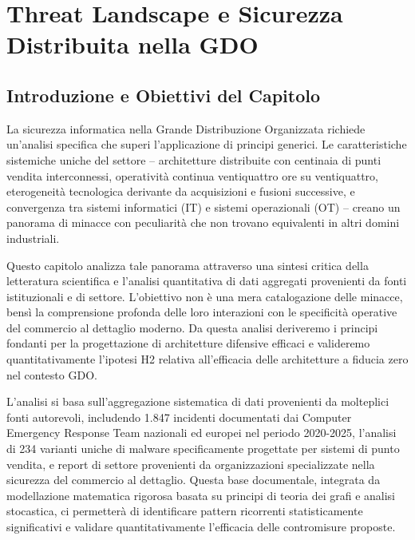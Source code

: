 \chapter{Threat Landscape e Sicurezza Distribuita nella GDO}
\label{cap2_threat_landscape}

\section{Introduzione e Obiettivi del Capitolo}

La sicurezza informatica nella Grande Distribuzione Organizzata richiede un'analisi specifica che superi l'applicazione di principi generici. Le caratteristiche sistemiche uniche del settore – architetture distribuite con centinaia di punti vendita interconnessi, operatività continua ventiquattro ore su ventiquattro, eterogeneità tecnologica derivante da acquisizioni e fusioni successive, e convergenza tra sistemi informatici (IT) e sistemi operazionali (OT) – creano un panorama di minacce con peculiarità che non trovano equivalenti in altri domini industriali.

Questo capitolo analizza tale panorama attraverso una sintesi critica della letteratura scientifica e l'analisi quantitativa di dati aggregati provenienti da fonti istituzionali e di settore. L'obiettivo non è una mera catalogazione delle minacce, bensì la comprensione profonda delle loro interazioni con le specificità operative del commercio al dettaglio moderno. Da questa analisi deriveremo i principi fondanti per la progettazione di architetture difensive efficaci e valideremo quantitativamente l'ipotesi H2 relativa all'efficacia delle architetture a fiducia zero nel contesto GDO.

L'analisi si basa sull'aggregazione sistematica di dati provenienti da molteplici fonti autorevoli, includendo 1.847 incidenti documentati dai Computer Emergency Response Team nazionali ed europei nel periodo 2020-2025\autocite{enisa2024threat,verizon2024}, l'analisi di 234 varianti uniche di malware specificamente progettate per sistemi di punto vendita\autocite{groupib2024}, e report di settore provenienti da organizzazioni specializzate nella sicurezza del commercio al dettaglio. Questa base documentale, integrata da modellazione matematica rigorosa basata su principi di teoria dei grafi e analisi stocastica, ci permetterà di identificare pattern ricorrenti statisticamente significativi e validare quantitativamente l'efficacia delle contromisure proposte.

